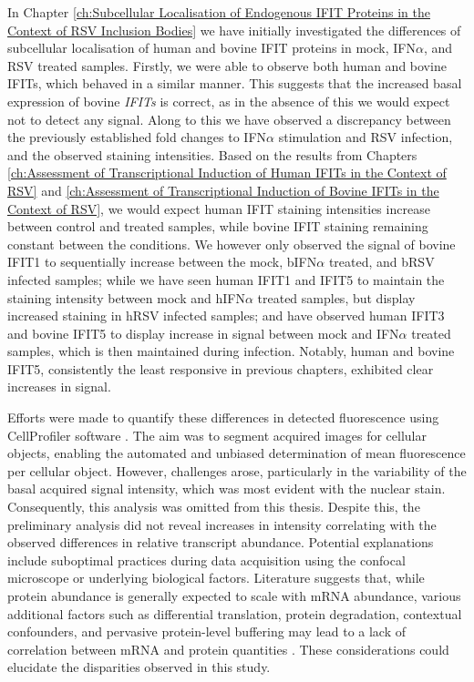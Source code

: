 

In Chapter \ref{ch:Subcellular Localisation of Endogenous IFIT Proteins in the Context of RSV Inclusion Bodies} we have initially investigated the differences of subcellular localisation of human and bovine IFIT proteins in mock, IFN$\alpha$, and RSV treated samples. Firstly, we were able to observe both human and bovine IFITs, which behaved in a similar manner. This suggests that the increased basal expression of bovine \textit{IFITs} is correct, as in the absence of this we would expect not to detect any signal. Along to this we have observed a discrepancy between the previously established fold changes to IFN$\alpha$ stimulation and RSV infection, and the observed staining intensities. Based on the results from Chapters \ref{ch:Assessment of Transcriptional Induction of Human IFITs in the Context of RSV} and \ref{ch:Assessment of Transcriptional Induction of Bovine IFITs in the Context of RSV}, we would expect human IFIT staining intensities increase between control and treated samples, while bovine IFIT staining remaining constant between the conditions. We however only observed the signal of bovine IFIT1 to sequentially increase between the mock, bIFN$\alpha$ treated, and bRSV infected samples; while we have seen human IFIT1 and IFIT5 to maintain the staining intensity between mock and hIFN$\alpha$ treated samples, but display increased staining in hRSV infected samples; and have observed human IFIT3 and bovine IFIT5 to display increase in signal between mock and IFN$\alpha$ treated samples, which is then maintained during infection. Notably, human and bovine IFIT5, consistently the least responsive in previous chapters, exhibited clear increases in signal. 

Efforts were made to quantify these differences in detected fluorescence using CellProfiler software \cite{McQuin2018CellProfilerBiology}. The aim was to segment acquired images for cellular objects, enabling the automated and unbiased determination of mean fluorescence per cellular object. However, challenges arose, particularly in the variability of the basal acquired signal intensity, which was most evident with the nuclear stain. Consequently, this analysis was omitted from this thesis. Despite this, the preliminary analysis did not reveal increases in intensity correlating with the observed differences in relative transcript abundance. Potential explanations include suboptimal practices during data acquisition using the confocal microscope or underlying biological factors. Literature suggests that, while protein abundance is generally expected to scale with mRNA abundance, various additional factors such as differential translation, protein degradation, contextual confounders, and pervasive protein-level buffering may lead to a lack of correlation between mRNA and protein quantities \cite{Liu2016OnAbundance, Buccitelli2020MRNAsControl}. These considerations could elucidate the disparities observed in this study.

